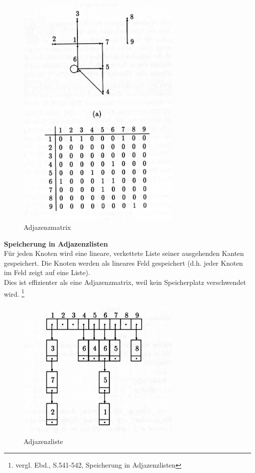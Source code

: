 \begin{figure}[h]
\centering
\includegraphics[width = 8cm]{./chapters/adjazenzmatrix.jpg}
\caption{Adjazenzmatrix \cite[S.539 Abb. 8.4]{OttWid90}
}
\label{a2}
\end{figure}
 
\textbf{Speicherung in Adjazenzlisten}\\
Für jeden Knoten wird eine lineare, verkettete Liste seiner ausgehenden Kanten gespeichert.
Die Knoten werden als lineares Feld gespeichert (d.h. jeder Knoten im Feld zeigt auf eine Liste). \\
Dies ist effizienter als eine Adjazenzmatrix, weil kein Speicherplatz verschwendet wird.
 \footnote{vergl. Ebd., S.541-542, Speicherung in Adjazenzlisten} \\

\begin{figure}[h]
\centering
\includegraphics[width = 8cm]{./chapters/adjazenzliste.jpg}
\caption{Adjazenzliste \cite[S542 Abb 8.6]{OttWid90}
}
\label{a3}
\end{figure} 

